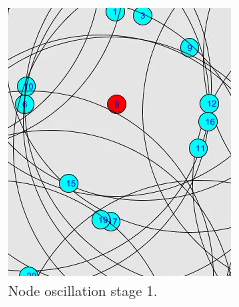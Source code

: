 \documentclass[authoryearcitations]{UoYCSproject}
\begin{document}
\begin{figure}
 \centering
    \begin{subfigure}[t]{.48\textwidth}
        \includegraphics[width=\textwidth]{figures/singlenodeOscil1.png}
        \caption{Node oscillation stage 1.}
        \label{fig:singlenodeOscil1}
    \end{subfigure}
    ~
    \begin{subfigure}[t]{.48\textwidth}

\end{subfigure}
\end{figure}
\end{document}
